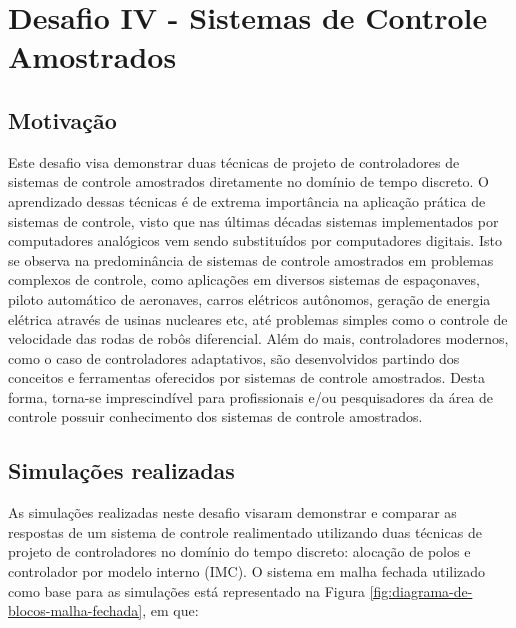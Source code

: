\section{Desafio IV - Sistemas de Controle Amostrados} 

\subsection{Motivação}
Este desafio visa demonstrar duas técnicas de projeto de controladores de
sistemas de controle amostrados diretamente no domínio de tempo discreto. O
aprendizado dessas técnicas é de extrema importância na aplicação prática de
sistemas de controle, visto que nas últimas décadas sistemas implementados por
computadores analógicos vem sendo substituídos por computadores digitais. Isto
se observa na predominância de sistemas de controle amostrados em problemas
complexos de controle, como aplicações em diversos sistemas de espaçonaves,
piloto automático de aeronaves, carros elétricos autônomos, geração de energia
elétrica através de usinas nucleares etc, até problemas simples como o controle
de velocidade das rodas de robôs diferencial. Além do mais, controladores
modernos, como o caso de controladores adaptativos, são desenvolvidos partindo
dos conceitos e ferramentas oferecidos por sistemas de controle amostrados.
Desta forma, torna-se imprescindível para profissionais e/ou pesquisadores da
área de controle possuir conhecimento dos sistemas de controle amostrados.

\subsection{Simulações realizadas}
\label{sub:simulacoes-realizadas-desafio4}
As simulações realizadas neste desafio visaram demonstrar e comparar as
respostas de um sistema de controle realimentado utilizando duas técnicas de
projeto de controladores no domínio do tempo discreto: alocação de polos e
controlador por modelo interno (IMC). O sistema em malha fechada utilizado como
base para as simulações está representado na Figura
\ref{fig:diagrama-de-blocos-malha-fechada}, em que:

